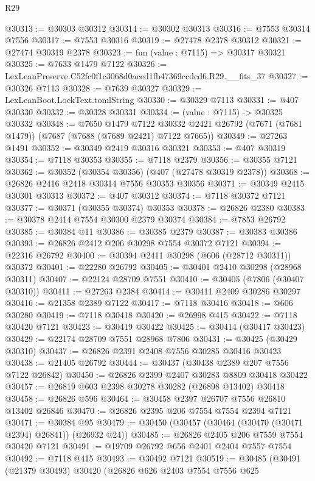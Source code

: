 \begin{lexlean}{R29}
\begin{coremodule}
@30313 := @30303 @30312
@30314 := @30302 @30313
@30316 := @7553 @30314 @7556
@30317 := @7553 @30316
@30319 := @27478 @2378 @30312
@30321 := @27474 @30319 @2378
@30323 := fun (value : @7115) => @30317 @30321
@30325 := @7633 @1479 @7122
@30326 := LexLeanPreserve.C52fc0f1c3068d0aced1fb47369ccdcd6.R29.__fits_37
@30327 := @30326 @7113
@30328 := @7639 @30327
@30329 := LexLeanBoot.LockText.tomlString
@30330 := @30329 @7113
@30331 := @407 @30330
@30332 := @30328 @30331
@30334 := (value : @7115) -> @30325 @30332
@30348 := @7650
    @1479
    @7122
    @30332
    @2421
    @26792
    (@7671 (@7681 @1479))
    (@7687 (@7688 (@7689 @2421) @7122 @7665))
@30349 := @27263 @1491
@30352 := @30349 @2419 @30316 @30321
@30353 := @407 @30319
@30354 := @7118 @30353
@30355 := @7118 @2379
@30356 := @30355 @7121
@30362 := @30352 (@30354 @30356) (@407 (@27478 @30319 @2378))
@30368 := @26826 @2416 @2418 @30314 @7556 @30353 @30356
@30371 := @30349 @2415 @30301 @30313
@30372 := @407 @30312
@30374 := @7118 @30372 @7121
@30377 := @30371 (@30355 @30374) @30353
@30378 := @26826 @2380
@30383 := @30378 @2414 @7554 @30300 @2379 @30374
@30384 := @7853 @26792
@30385 := @30384 @11
@30386 := @30385 @2379
@30387 := @30383 @30386
@30393 := @26826 @2412 @206 @30298 @7554 @30372 @7121
@30394 := @22316 @26792
@30400 := @30394 @2411 @30298 (@606 (@28712 @30311)) @30372
@30401 := @22280 @26792
@30405 := @30401 @2410 @30298 (@28968 @30311)
@30407 := @22124 @28709 @7551
@30410 := @30405 (@7806 (@30407 @30310))
@30411 := @27263 @2384
@30414 := @30411 @2409 @30286 @30297
@30416 := @21358 @2389 @7122
@30417 := @7118 @30416
@30418 := @606 @30280
@30419 := @7118 @30418
@30420 := @26998 @415
@30422 := @7118 @30420 @7121
@30423 := @30419 @30422
@30425 := @30414 (@30417 @30423)
@30429 := @22174 @28709 @7551 @28968 @7806
@30431 := @30425 (@30429 @30310)
@30437 := @26826 @2391 @2408 @7556 @30285 @30416 @30423
@30438 := @21405 @26792
@30444 := @30437 (@30438 @2389 @207 @7556 @7122 @26842)
@30450 := @26826 @2399 @2407 @30283 @8809 @30418 @30422
@30457 := @26819 @603 @2398 @30278 @30282 (@26898 @13402) @30418
@30458 := @26826 @596
@30464 := @30458 @2397 @26707 @7556 @26810 @13402 @26846
@30470 := @26826 @2395 @206 @7554 @7554 @2394 @7121
@30471 := @30384 @95
@30479 := @30450 (@30457 (@30464 (@30470 (@30471 @2394) @26841)) (@26932 @24))
@30485 := @26826 @2405 @206 @7559 @7554 @30420 @7121
@30491 := @19709 @26792 @656 @2401 @2404 @7557 @7554
@30492 := @7118 @415
@30493 := @30492 @7121
@30519 := @30485
    (@30491
      (@21379 @30493)
      @30420
      (@26826
        @626
        @2403
        @7554
        @7556
        @625

\end{coremodule}
\end{lexlean}
